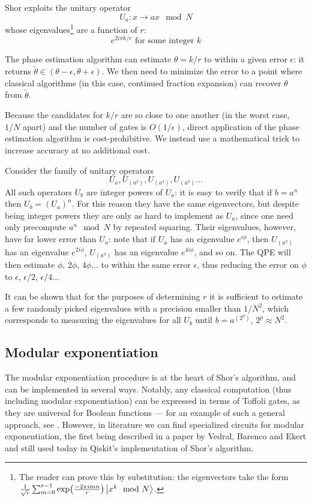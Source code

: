 \documentclass[conference]{IEEEtran}
\begin{document}
Shor exploits the unitary operator
\begin{equation}
U_a: x \rightarrow ax \mod N
\end{equation}
whose eigenvalues\footnote{The reader can prove this by substitution: the eigenvectors take the form $\frac{1}{\sqrt{r}}\sum_{m=0}^{r-1}\exp(\frac{-2\pi i m n}{r})\ket{x^k \mod N}$.} are a function of $r$:
\begin{equation}
e^{2i\pi k/r}\text{ for some integer }k
\end{equation}

The phase estimation algorithm can estimate $\theta=k/r$ to within a given error $\epsilon$: it returns $\widetilde\theta \in (\theta-\epsilon, \theta+\epsilon)$. We then need to minimize the error to a point where classical algorithms (in this case, continued fraction expansion) can recover $\theta$ from $\widetilde\theta$.

Because the candidates for $k/r$ are so close to one another (in the worst case, $1/N$ apart) and the number of gates is $O(1/\epsilon)$, direct application of the phase estimation algorithm is cost-prohibitive. We instead use a mathematical trick to increase accuracy at no additional cost.

Consider the family of unitary operators
\begin{equation}
U_a, U_{(a^2)}, U_{(a^4)}, U_{(a^8)}...
\end{equation}
All such operators $U_b$ are integer powers of $U_a$: it is easy to verify that if $b = a^n$ then $U_b = (U_a)^n$. For this reason they have the same eigenvectors, but despite being integer powers they are only as hard to implement as $U_a$, since one need only precompute $a^n \mod N$ by repeated squaring. Their eigenvalues, however, have far lower error than $U_a$: note that if $U_a$ has an eigenvalue $e^{i\phi}$, then $U_{(a^2)}$ has an eigenvalue $e^{2i\phi}$, $U_{(a^4)}$ has an eigenvalue $e^{4i\phi}$, and so on. The QPE will then estimate $\phi$, $2\phi$, $4\phi$... to within the same error $\epsilon$, thus reducing the error on $\phi$ to $\epsilon$, $\epsilon/2$, $\epsilon/4$...

It can be shown that for the purposes of determining $r$ it is sufficient to estimate a few randomly picked eigenvalues with a precision smaller than $1/N^2$, which corresponds to measuring the eigenvalues for all $U_b$ until $b=a^{(2^p)}$, $2^p \approx N^2$.

\subsection{Modular exponentiation}
The modular exponentiation procedure is at the heart of Shor's algorithm, and can be implemented in several ways. Notably, any classical computation (thus including modular exponentiation) can be expressed in terms of Toffoli gates, as they are universal for Boolean functions --- for an example of such a general approach, see \cite{toffoli}. However, in literature we can find specialized circuits for modular exponentiation, the first being described in a paper \cite{vbe} by Vedral, Barenco and Ekert and still used today in Qiskit's implementation of Shor's algorithm.
\end{document}
